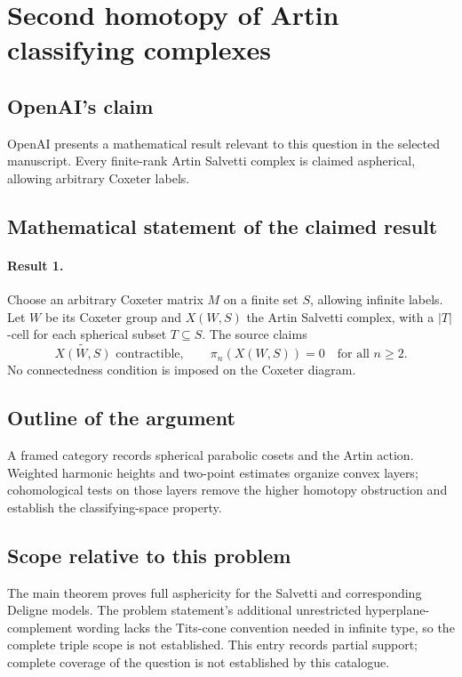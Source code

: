 \documentclass[11pt]{article}
\begin{document}
\section*{Second homotopy of Artin classifying complexes}

\subsection{OpenAI's claim}
OpenAI presents a mathematical result relevant to this question in the selected manuscript. Every finite-rank Artin Salvetti complex is claimed aspherical, allowing arbitrary Coxeter labels.

\subsection{Mathematical statement of the claimed result}
\paragraph{Result 1.} Choose an arbitrary Coxeter matrix \(M\) on a finite set \(S\), allowing infinite labels. Let \(W\) be its Coxeter group and \(X(W,S)\) the Artin Salvetti complex, with a \(|T|\)-cell for each spherical subset \(T\subseteq S\). The source claims
\[
 \widetilde{X(W,S)}\text{ contractible},\qquad
 \pi_n(X(W,S))=0\quad\text{for all }n\ge2.
\]
No connectedness condition is imposed on the Coxeter diagram.

\subsection{Outline of the argument}
A framed category records spherical parabolic cosets and the Artin action. Weighted harmonic heights and two-point estimates organize convex layers; cohomological tests on those layers remove the higher homotopy obstruction and establish the classifying-space property.

\subsection{Scope relative to this problem}
The main theorem proves full asphericity for the Salvetti and corresponding Deligne models. The problem statement’s additional unrestricted hyperplane-complement wording lacks the Tits-cone convention needed in infinite type, so the complete triple scope is not established. This entry records partial support; complete coverage of the question is not established by this catalogue.
\end{document}
